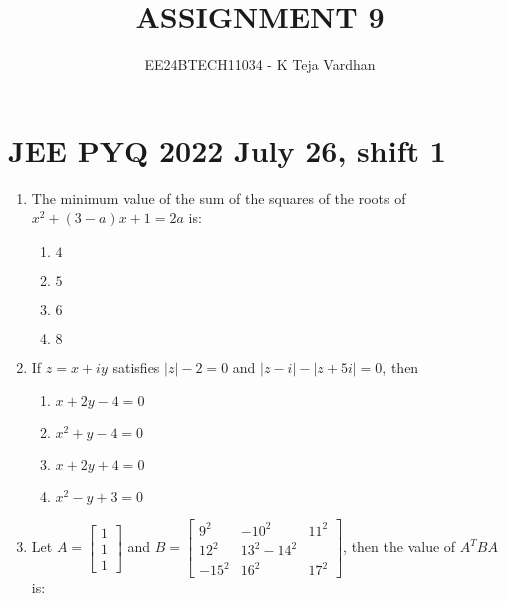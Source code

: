\documentclass[journal]{IEEEtran}
\newcommand{\brak}[1]{\left( #1 \right)}
\newcommand{\abs}[1]{\left| #1 \right|}
\begin{document}

\title{ASSIGNMENT 9}
\author{EE24BTECH11034 - K Teja Vardhan}
{\let\newpage\relax\maketitle}

\section{JEE PYQ 2022 July 26, shift 1}
\begin{enumerate}

    \item The minimum value of the sum of the squares of the roots of $x^2 + \brak{3-a}x + 1 = 2a$ is:
    
        \begin{multicols}{4}
        \begin{enumerate}
        \item $4$
        \item $5$
        \item $6$
        \item $8$
        \end{enumerate}
        \end{multicols}
        
    \item If $z = x + iy$ satisfies $\abs{z} - 2 = 0$ and $\abs{z - i} - \abs{z + 5i} = 0$, then

        \begin{multicols}{4}
        \begin{enumerate}
        \item $x + 2y - 4 = 0$
        \item $x^{2} + y - 4 = 0$
        \item $x + 2y + 4 = 0$
        \item $x^{2} - y + 3 = 0$
        \end{enumerate}
        \end{multicols}

    \item Let $A = \begin{bmatrix} 1\\ 1\\ 1 \end{bmatrix}$ and $B = \begin{bmatrix} 9^{2} & -10^{2} & 11^{2} \\ 12^{2} & 13^{2} - 14^{2} \\ -15^{2} & 16^{2} & 17^{2} \end{bmatrix}$, then the value of $A^{T} B A$ is:


\end{enumerate}
\end{document}
